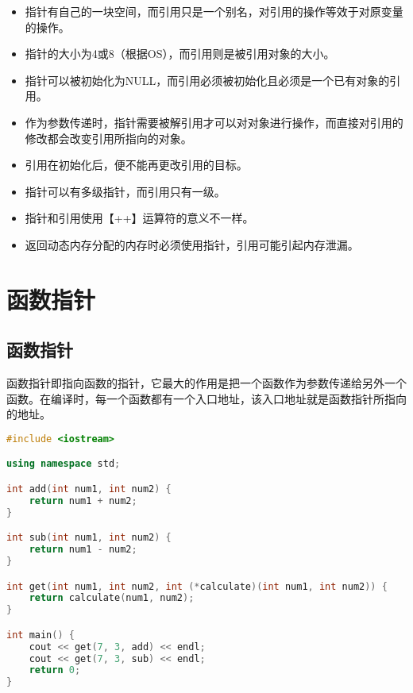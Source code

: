 \begin{itemize}
	\item 指针有自己的一块空间，而引用只是一个别名，对引用的操作等效于对原变量的操作。

	\item 指针的大小为4或8（根据OS），而引用则是被引用对象的大小。

	\item 指针可以被初始化为NULL，而引用必须被初始化且必须是一个已有对象的引用。

	\item 作为参数传递时，指针需要被解引用才可以对对象进行操作，而直接对引用的修改都会改变引用所指向的对象。

	\item 引用在初始化后，便不能再更改引用的目标。

	\item 指针可以有多级指针，而引用只有一级。

	\item 指针和引用使用【++】运算符的意义不一样。

	\item 返回动态内存分配的内存时必须使用指针，引用可能引起内存泄漏。
\end{itemize}

\newpage

\section{函数指针}

\subsection{函数指针}

函数指针即指向函数的指针，它最大的作用是把一个函数作为参数传递给另外一个函数。在编译时，每一个函数都有一个入口地址，该入口地址就是函数指针所指向的地址。\\


\begin{lstlisting}[language=C++]
#include <iostream>

using namespace std;

int add(int num1, int num2) {
    return num1 + num2;
}

int sub(int num1, int num2) {
    return num1 - num2;
}

int get(int num1, int num2, int (*calculate)(int num1, int num2)) {
    return calculate(num1, num2);
}

int main() {
    cout << get(7, 3, add) << endl;
    cout << get(7, 3, sub) << endl;
    return 0;
}
\end{lstlisting}

